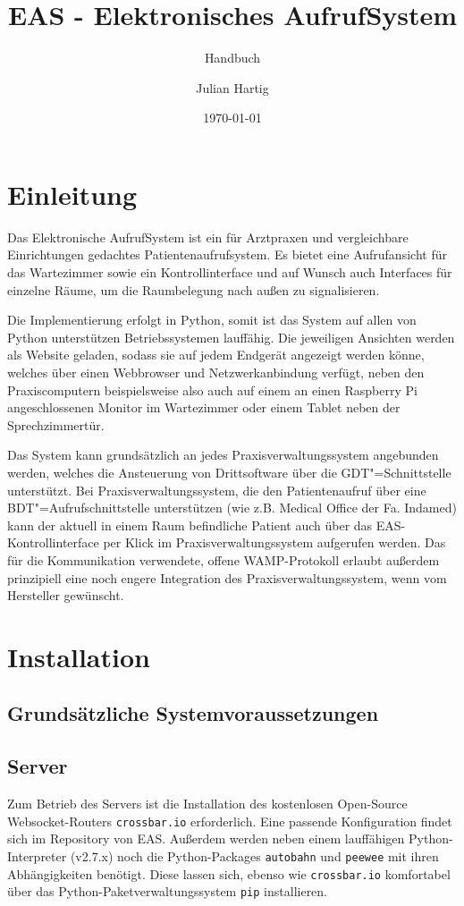 \documentclass[a4paper,10pt]{scrreprt}
\title{EAS - Elektronisches AufrufSystem}
\subtitle{Handbuch}
\date{\today}
\author{Julian Hartig}
\begin{document}
\maketitle
\tableofcontents
\newpage
\chapter{Einleitung}
Das Elektronische AufrufSystem ist ein für Arztpraxen und vergleichbare Einrichtungen gedachtes Patientenaufrufsystem. Es bietet eine Aufrufansicht für das Wartezimmer sowie ein Kontrollinterface und auf Wunsch auch Interfaces für einzelne Räume, um die Raumbelegung nach außen zu signalisieren. 

Die Implementierung erfolgt in Python, somit ist das System auf allen von Python unterstützen Betriebssystemen lauffähig. Die jeweiligen Ansichten werden als Website geladen, sodass sie auf jedem Endgerät angezeigt werden könne, welches über einen Webbrowser und Netzwerkanbindung verfügt,
neben den Praxiscomputern beispielsweise also auch auf einem an einen Raspberry Pi angeschlossenen Monitor im Wartezimmer oder einem Tablet neben der Sprechzimmertür.

Das System kann grundsätzlich an jedes Praxisverwaltungssystem angebunden werden, welches die Ansteuerung von Drittsoftware über die GDT"=Schnittstelle unterstützt. Bei Praxisverwaltungssystem, die den Patientenaufruf über eine BDT"=Aufrufschnittstelle unterstützen (wie z.B. Medical Office der Fa. Indamed)
kann der aktuell in einem Raum befindliche Patient auch über das EAS-Kontrollinterface per Klick im Praxisverwaltungssystem aufgerufen werden. Das für die Kommunikation verwendete, offene WAMP-Protokoll erlaubt außerdem prinzipiell eine noch engere Integration des Praxisverwaltungssystem, wenn vom Hersteller 
gewünscht.

\chapter{Installation}
\section{Grundsätzliche Systemvoraussetzungen}
\section{Server}
Zum Betrieb des Servers ist die Installation des kostenlosen Open-Source Websocket-Routers \texttt{crossbar.io} erforderlich. Eine passende Konfiguration findet sich im Repository von EAS.
Außerdem werden neben einem lauffähigen Python-Interpreter (v2.7.x) noch die Python-Packages \texttt{autobahn} und \texttt{peewee} mit ihren Abhängigkeiten benötigt. Diese lassen sich, ebenso wie \texttt{crossbar.io} komfortabel über
das Python-Paketverwaltungssystem \texttt{pip} installieren.
\end{document}
